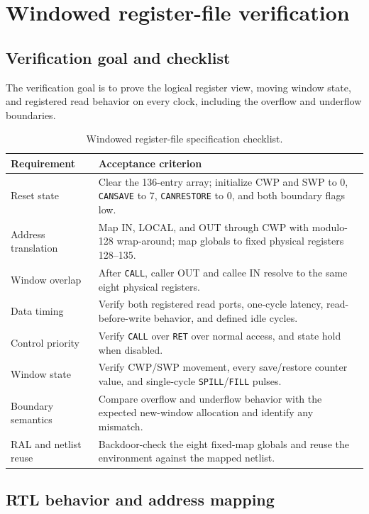 \documentclass[11pt,a4paper]{article}
\newcommand{\code}[1]{\texttt{#1}}
\begin{document}
\section{Windowed register-file verification}

\subsection{Verification goal and checklist}

The verification goal is to prove the logical register view, moving window state, and registered read behavior on every clock, including the overflow and underflow boundaries.

\begin{table}[H]
\centering
\caption{Windowed register-file specification checklist.}
\begin{tabularx}{0.97\textwidth}{@{}p{}Y@{}}
\toprule
\textbf{Requirement} & \textbf{Acceptance criterion} \\
\midrule
Reset state & Clear the 136-entry array; initialize CWP and SWP to 0, \code{CANSAVE} to 7, \code{CANRESTORE} to 0, and both boundary flags low. \\
Address translation & Map IN, LOCAL, and OUT through CWP with modulo-128 wrap-around; map globals to fixed physical registers 128--135. \\
Window overlap & After \code{CALL}, caller OUT and callee IN resolve to the same eight physical registers. \\
Data timing & Verify both registered read ports, one-cycle latency, read-before-write behavior, and defined idle cycles. \\
Control priority & Verify \code{CALL} over \code{RET} over normal access, and state hold when disabled. \\
Window state & Verify CWP/SWP movement, every save/restore counter value, and single-cycle \code{SPILL}/\code{FILL} pulses. \\
Boundary semantics & Compare overflow and underflow behavior with the expected new-window allocation and identify any mismatch. \\
RAL and netlist reuse & Backdoor-check the eight fixed-map globals and reuse the environment against the mapped netlist. \\
\bottomrule
\end{tabularx}
\end{table}

\subsection{RTL behavior and address mapping}
\end{document}
